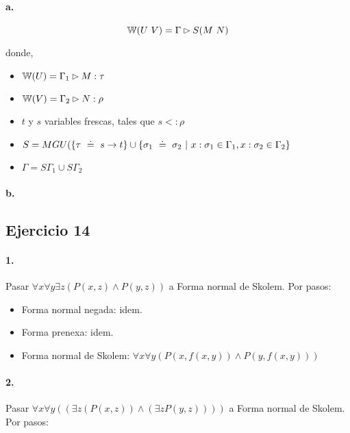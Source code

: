 \paragraph{a.}

\[\w{U\ V} = \Gamma \rhd S(M\ N)\]

donde,

\begin{itemize}
  \item $\mathbb{W}(U) = \Gamma_1 \rhd M : \tau$
  \item $\mathbb{W}(V) = \Gamma_2 \rhd N : \rho$
  \item $t$ y $s$ variables frescas, tales que $s <: \rho$
  \item $S = MGU(\{\tau \uni s\to t\} \cup \{\sigma_1 \uni \sigma_2 \vert x:\sigma_1 \in \Gamma_1, x:\sigma_2 \in \Gamma_2\}$
  \item $\Gamma = S\Gamma_1 \cup S\Gamma_2$
\end{itemize}


\paragraph{b.}


\subsection*{Ejercicio 14}

\paragraph{1.}

Pasar $\forall x\forall y\exists z (P(x,z)\land P(y,z))$ a Forma normal de Skolem. Por pasos:

\begin{itemize}
  \item Forma normal negada: idem.
  \item Forma prenexa: idem.
  \item Forma normal de Skolem: $\forall x\forall y (P(x,f(x,y))\land P(y,f(x,y)))$
\end{itemize}

\paragraph{2.}

Pasar $\forall x\forall y((\exists z (P(x,z))\land (\exists z P(y,z))))$ a Forma normal de Skolem. Por pasos:


